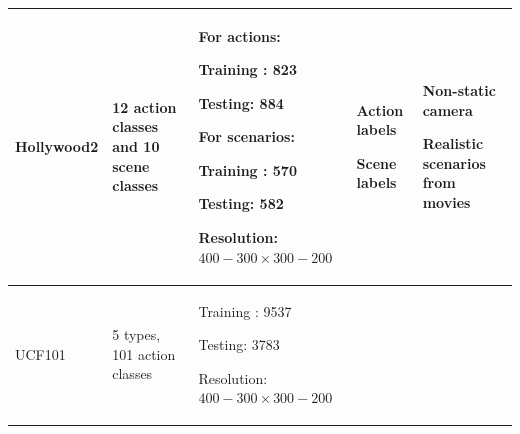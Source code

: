 \begin{table}
\begin{center}
\begin{tabular}{| p{2.5cm} | p{1.5cm} | p{4cm} | p{3cm} | p{4cm} |}
	    	Hollywood2\cite{marszalek09}
	    	& %
	    	12 action classes and 10 scene classes
	    	& %
	    	For actions:
	    	\vspace{-3mm}
	    	\begin{myitemize}
	    		\item Training : 823
	    		\item Testing: 884	
	    	\end{myitemize}
    		For scenarios:
    		\vspace{-3mm}
    		\begin{myitemize}
    			\item Training : 570
    			\item Testing: 582	
    		\end{myitemize}
    		Resolution: \(400-300 \times 300-200\)
	    	& %
	    	\vspace{-5mm}
	    	\begin{myitemize}
	    		\item Action labels
	    		\item Scene labels
	    	\end{myitemize}
	    	& %
	    	\vspace{-5mm}
	    	\begin{myitemize}
	    		\item Non-static camera
	    		\item Realistic scenarios from movies
	      	\end{myitemize}
	    	\\ \hline 


	    	UCF101\cite{ucf101}
	    	& %
	    	5 types, 101 action classes
	    	& %
	    	\vspace{-5mm}
	    	\begin{myitemize}
	    		\item Training : 9537
	    		\item Testing: 3783
	    		\item Resolution: \(400-300 \times 300-200\)	
	    	\end{myitemize}
	    	

\end{tabular}
\end{center}
\end{table}

